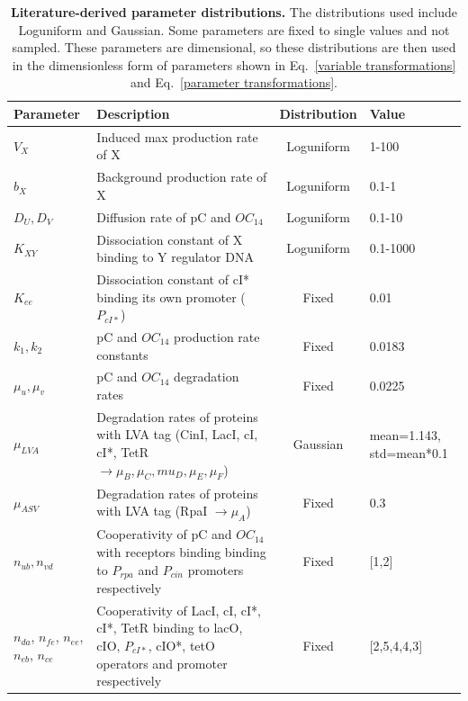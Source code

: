 \begin{table}[H]
    \caption{\textbf{Literature-derived parameter distributions.} The distributions used include Loguniform and Gaussian. Some parameters are fixed to single values and not sampled. These parameters are dimensional, so these distributions are then used in the dimensionless form of parameters shown in Eq.~\ref{variable transformations} and Eq.~\ref{parameter transformations}.}
\label{tab:param distributions}
\renewcommand{\arraystretch}{1.3} %
\begin{tabular}{|p{20mm}|p{57mm}|c|p{25mm}|}
\hline
\textbf{Parameter} & \textbf{Description} & \textbf{Distribution} & \textbf{Value}\\
\hline

$V_{X}$ & Induced max production rate of X & Loguniform &  1-100 \\
\hline
$b_{X}$ & Background production rate of X & Loguniform & 0.1-1\\
\hline
$D_{U}, D_{V}$ & Diffusion rate of pC and $OC_{14}$ & Loguniform & 0.1-10\\
\hline
$K_{XY}$ & Dissociation constant of X binding to Y regulator DNA & Loguniform & 0.1-1000\\
\hline
$K_{ee}$ & Dissociation constant of cI* binding its own promoter ($P_{cI*}$) & Fixed & 0.01\\
\hline
$k_{1},k_{2}$ & pC and $OC_{14}$ production rate constants  & Fixed & 0.0183\\
\hline
$\mu_{u},\mu_{v}$ & pC and $OC_{14}$ degradation rates & Fixed & 0.0225\\
\hline
$\mu_{LVA}$ & Degradation rates of proteins with LVA tag (CinI, LacI, cI, cI*, TetR $\rightarrow \mu_{B}, \mu_{C}, mu_{D}, \mu_{E}, \mu_{F}$) & Gaussian & mean=1.143, std=mean*0.1\\
\hline
$\mu_{ASV}$ & Degradation rates of proteins with LVA tag (RpaI $\rightarrow \mu_{A}$) & Fixed & 0.3\\
\hline
$n_{ub}, n_{vd}$ & Cooperativity of pC and $OC_{14}$ with receptors binding binding to $P_{rpa}$ and $P_{cin}$ promoters respectively & Fixed & [1,2]\\
\hline
$n_{da}$, $n_{fe}$, $n_{ee}$, $n_{eb}$, $n_{ce}$ & Cooperativity of LacI, cI, cI*, cI*, TetR binding to lacO, cIO, $P_{cI*}$, cIO*, tetO operators and promoter respectively & Fixed & [2,5,4,4,3]\\
\hline
\end{tabular}
\end{table}

